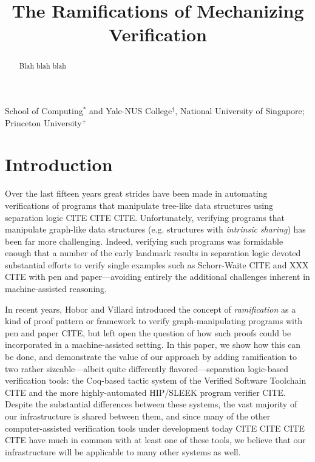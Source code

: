 \documentclass[pldi]{sigplanconf-pldi15}
\begin{document}
%
%

\title{The Ramifications of Mechanizing Verification}
{}
{School of Computing$^{*}$ and Yale-NUS College$^{\dagger}$, National University of Singapore; Princeton University$^{+}$}

\maketitle
\begin{abstract}
Blah blah blah
\end{abstract}

\newcommand\hide[1]{}

\section{Introduction}
Over the last fifteen years great strides have been made in automating verifications of programs that manipulate
tree-like data structures using separation logic CITE CITE CITE.  Unfortunately, verifying programs that manipulate 
graph-like data structures (e.g. structures with \emph{intrinsic sharing}) has been far more challenging.
Indeed, verifying such programs was formidable enough that a number of the early landmark results in separation logic
devoted substantial efforts to verify single examples such as Schorr-Waite CITE and XXX CITE with pen and 
paper---avoiding entirely the additional challenges inherent in machine-assisted reasoning.

In recent years, Hobor and Villard introduced the concept of \emph{ramification} as a kind of proof pattern or framework
to verify graph-manipulating programs with pen and paper CITE, but left open the question of how such proofs could
be incorporated in a machine-assisted setting.  In this paper, we show how this can be done, and demonstrate the
value of our approach by adding ramification to two rather sizeable---albeit quite differently flavored---separation logic-based 
verification tools: the Coq-based tactic system of the Verified Software Toolchain CITE and the more highly-automated HIP/SLEEK
program verifier CITE.  Despite the substantial differences between these systems, the vast majority of our infrastructure is 
shared between them, and since many of the other computer-assisted verification tools under development 
today CITE CITE CITE CITE have much in common with at least one of these tools, we believe that our infrastructure will be 
applicable to many other systems as well.
\end{document}
